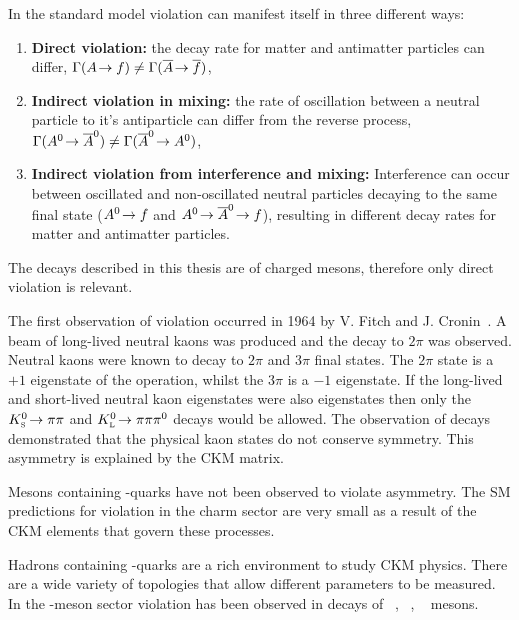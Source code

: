 In the standard model \CP violation can manifest itself in three different ways: 
\begin{enumerate}
\item \textbf{Direct \CP violation:} the decay rate for matter and antimatter particles can differ, $\Gamma(A\!\rightarrow f)\neq \Gamma(\overline{A}\!\rightarrow \overline{f})$,  
\item \textbf{Indirect \CP violation in mixing:} the rate of oscillation between a neutral particle to it's antiparticle can differ from the reverse process, $\Gamma(A^0\!\rightarrow \overline{A}^0)\neq \Gamma(\overline{A}^0\!\rightarrow A^0)$,
\item \textbf{Indirect \CP violation from interference and mixing:} Interference can occur between oscillated and non-oscillated neutral particles decaying to the same final state ($A^0\!\rightarrow f$ and $A^0\!\rightarrow \overline{A}^0\!\rightarrow f$), resulting in different decay rates for matter and antimatter particles. 
\end{enumerate}

The decays described in this thesis are of charged \B mesons, therefore only direct \CP violation is relevant.




The first observation of \CP violation occurred in 1964 by V. Fitch and J. Cronin~\cite{PhysRevLett.13.138}.  
A beam of long-lived neutral kaons was produced and the decay to $2\pi$ was observed. Neutral kaons were known to decay to $2\pi$ and $3\pi$ final states. The $2\pi$ state is a $+1$ eigenstate of the \CP operation, whilst the $3\pi$ is a $-1$ eigenstate. If the long-lived and short-lived neutral kaon eigenstates were also \CP eigenstates then only the ${{K}^0_{\mathrm{ \scriptscriptstyle S}}}\!\rightarrow \pi\pi$ and ${{K}^0_{\mathrm{ \scriptscriptstyle L}}}\!\rightarrow \pi\pi{\ensuremath{{\pi}^0}}$ decays would be allowed. The observation of \decay{\KL}{\pip\pim} decays demonstrated that the physical kaon states do not conserve \CP symmetry. This \CP asymmetry is explained by the CKM matrix. 

Mesons containing \cquark-quarks have not been observed to violate \CP asymmetry. The SM predictions for \CP violation in the charm sector are very small as a result of the CKM elements that govern these processes.     

Hadrons containing \bquark-quarks are a rich environment to study CKM physics. 
There are a wide variety of topologies that allow different parameters to be measured. 
In the \bquark-meson sector \CP violation has been observed in decays of \Bp~\cite{PhysRevD.82.072004,PhysRevD.81.112002}, \Bz~\cite{PhysRevLett.87.091801,PhysRevLett.87.091802}, \Bs~\cite{PhysRevLett.110.221601} mesons.

